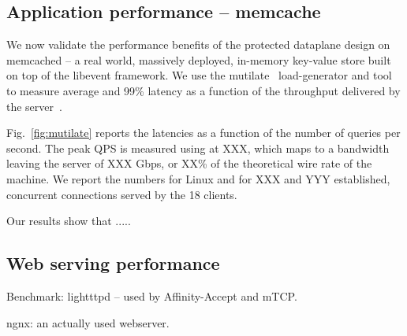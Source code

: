 \subsection{Application performance -- memcache}
\label{sec:eval:memcached}



We now validate the performance benefits of the protected dataplane
design on memcached -- a real world, massively deployed, in-memory
key-value store built on top of the libevent framework.  We use the
mutilate~\cite{url:mutilate} load-generator and tool to measure
average and 99\% latency as a function of the throughput delivered by
the server~\cite{Leverich:RHSU:2014}.

Fig.~\ref{fig:mutilate} reports the latencies as a function of the
number of queries per second.  The peak QPS is measured using \ix at
XXX, which maps to a bandwidth leaving the server of XXX Gbps, or XX\%
of the theoretical wire rate of the machine.  We report the numbers
for Linux and \ix for XXX and YYY established, concurrent
connections served by the 18 clients.

Our results show that .....

\subsection{Web serving performance}


\todo Benchmark: lightttpd -- used by Affinity-Accept and mTCP.  

\todo ngnx: an actually used webserver.



%
